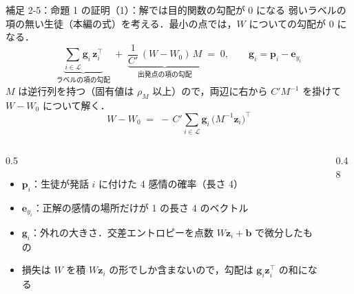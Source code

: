 \begin{frame}{補足 2-5：命題 1 の証明（1）：解では目的関数の勾配が 0 になる}
  \label{s:p2:span}
  \tighteq\scriptsize
  弱いラベルの項の無い生徒（本編の式）を考える．最小の点では，$W$ についての勾配が 0 になる．
  \[
    \underbrace{\sum_{i\in\mathcal L}\mathbf g_i\,\mathbf z_i^{\top}}_{\text{ラベルの項の勾配}}
    \;+\;\underbrace{\frac{1}{C'}\,(W-W_0)\,M}_{\text{出発点の項の勾配}} \;=\; 0,
    \qquad \mathbf g_i = \mathbf p_i - \mathbf e_{y_i}
  \]
  $M$ は逆行列を持つ（固有値は $\rho_M$ 以上）ので，両辺に右から $C' M^{-1}$ を掛けて $W-W_0$ について解く．
  \[
    W - W_0 \;=\; -\,C'\sum_{i\in\mathcal L}\mathbf g_i\,\bigl(M^{-1}\mathbf z_i\bigr)^{\top}
  \]
  \vspace{0.2em}
  \begin{columns}[T,onlytextwidth]
    \begin{column}{0.5\textwidth}
      \begin{itemize}\scriptsize\setlength{\itemsep}{3pt}
        \item $\mathbf p_i$：生徒が発話 $i$ に付けた 4 感情の確率（長さ 4）
        \item $\mathbf e_{y_i}$：正解の感情の場所だけが 1 の長さ 4 のベクトル
        \item $\mathbf g_i$：外れの大きさ．交差エントロピーを点数 $W\mathbf z_i + \mathbf b$ で微分したもの
        \item 損失は $W$ を積 $W\mathbf z_i$ の形でしか含まないので，勾配は $\mathbf g_i\mathbf z_i^{\top}$ の和になる
      \end{itemize}
    \end{column}
    \begin{column}{0.48\textwidth}
      \centering
      \par
      \vspace{0.3em}
    \end{column}
  \end{columns}
\end{frame}

